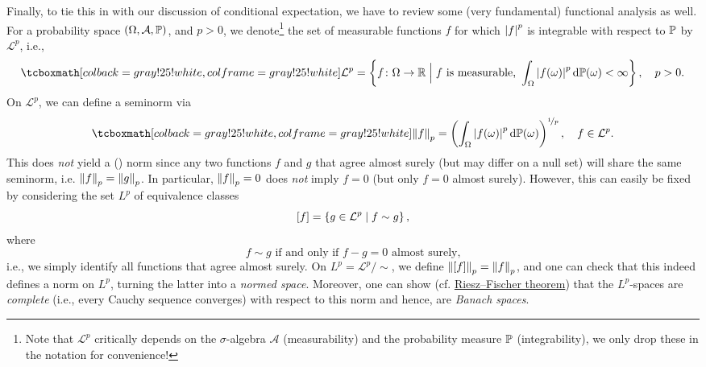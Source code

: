 Finally, to tie this in with our discussion of conditional expectation, we have to review some (very fundamental) functional analysis as well. For a probability space $(\Omega, \mathcal{A}, \P)$, and $p > 0$, we denote\footnote{Note that $\mathcal{L}^p$ critically depends on the $\sigma$-algebra $\mathcal{A}$ (measurability) and the probability measure $\P$ (integrability), we only drop these in the notation for convenience!} the set of measurable functions $f$ for which $\abs{f}^p$ is integrable with respect to $\P$ by $\mathcal{L}^p$, i.e.,
\[
    \highlightMath{
        \mathcal{L}^p = \set{ f \colon \Omega \to \R \with[\Big] f \text{ is measurable, } \int_{\Omega} \abs{f(\omega)}^p \, \mathrm{d}\P(\omega) < \infty}, \quad p > 0.
    }
\]
On $\mathcal{L}^p$, we can define a seminorm via
\[
    \highlightMath{
        \norm{f}_p = \left( \int_{\Omega} \abs{f(\omega)}^p \, \mathrm{d}\P(\omega) \right)^{\nicefrac{1}{p}}, \quad f \in \mathcal{L}^p.
    }
\]
This does \emph{not} yield a () norm since any two functions $f$ and $g$ that agree almost surely (but may differ on a null set) will share the same seminorm, i.e. $\norm{f}_p = \norm{g}_p$. In particular, $\norm{f}_p = 0$ does \emph{not} imply $f = 0$ (but only $f = 0$ almost surely). However, this can easily be fixed by considering the set $L^p$ of equivalence classes
\[
    [f] = \set{g \in \mathcal{L}^p \with f \sim g},
\]
where
\[
    f \sim g \text{ if and only if } f - g = 0 \text{ almost surely,}
\]
i.e., we simply identify all functions that agree almost surely. On $L^p = \mathcal{L}^p /{\sim}$, we define $\norm{[f]}_p = \norm{f}_p$, and one can check that this indeed defines a norm on $L^p$, turning the latter into a \emph{normed space}. Moreover, one can show (cf. \href{https://en.wikipedia.org/wiki/Riesz–Fischer_theorem#Completeness_of_Lp,_0_%3C_p_≤_∞}{Riesz–Fischer theorem}) that the $L^p$-spaces are \emph{complete} (i.e., every Cauchy sequence converges) with respect to this norm and hence, are \emph{Banach spaces}.

